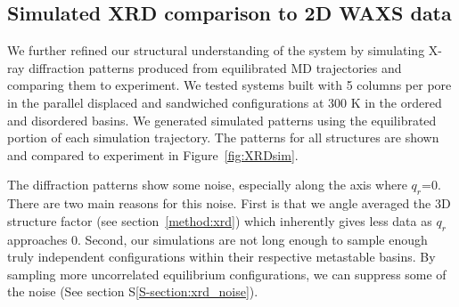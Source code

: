 \documentclass[journal=jpcbfk,manuscript=article]{achemso}
\begin{document}

  
  \subsection{Simulated XRD comparison to 2D WAXS data}
  
  We further refined our structural understanding of the system by simulating X-ray 
  diffraction patterns produced from equilibrated MD trajectories and comparing them
  to experiment. We tested systems built with 5 columns per pore in the parallel 
  displaced and sandwiched configurations at 300 K in the ordered and disordered
  basins. We generated simulated patterns using the equilibrated portion of each 
  simulation trajectory. The patterns for all structures are shown and compared to
  experiment in Figure~\ref{fig:XRDsim}.
  
  The diffraction patterns show some noise, especially along the axis where $q_r$=0. There are
  two main reasons for this noise. First is that we angle averaged the 3D structure factor 
  (see section~\ref{method:xrd}) which inherently gives less data as $q_r$ approaches 0. Second, 
  our simulations are not long enough to sample enough truly independent configurations within
  their respective metastable basins. By sampling more uncorrelated equilibrium configurations,
  we can suppress some of the noise (See section S\ref{S-section:xrd_noise}).
\end{document}
